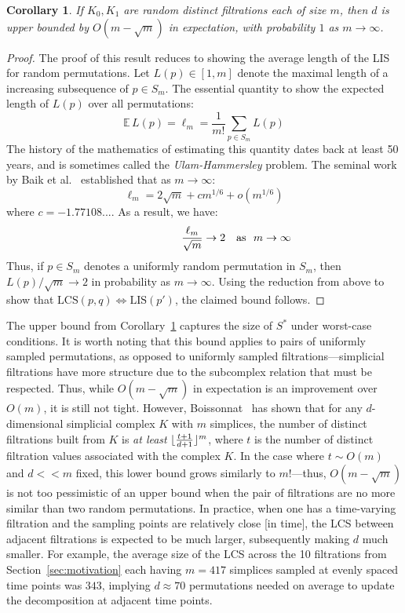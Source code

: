 \documentclass{article} %
\newtheorem{corollary}{Corollary}
\newtheorem{proof}{Proof}
\DeclarePairedDelimiter\floor{\lfloor}{\rfloor}
\begin{document}
\begin{corollary}\label{cor:expectation}
	If $K_0, K_1$ are random distinct filtrations each of size $m$, then $d$ is upper bounded by $O(m - \sqrt{m})$ in expectation, with probability $1$ as $m \to \infty$.
\end{corollary}
\begin{proof}
	The proof of this result reduces to showing the average length of the LIS for random permutations. Let $L(p) \in [1,m]$ denote the maximal length of a increasing subsequence of $p \in S_m$. 
	The essential quantity to show the expected length of $L(p)$ over all permutations: 
	$$ \mathbb{E} \, L(p) = \ell_m = \frac{1}{m!} \sum\limits_{p \in S_m} L(p)$$
	The history of the mathematics of estimating this quantity dates back at least 50 years, and is sometimes called the \emph{Ulam-Hammersley} problem. The seminal work by Baik et al.~\cite{baik1999distribution} established that as $m \to \infty$:
	$$ \displaystyle \ell_m = 2 \sqrt{m} + c m^{1/6} + o(m^{1/6}) $$
where $c = -1.77108...$. As a result, we have: 
$$ \frac{\ell_m}{\sqrt{m}} \to 2\rlap{\quad \text{as } $m \to \infty$} $$	 
Thus, if $p \in S_m$ denotes a uniformly random permutation in $S_m$, then $L(p)/\sqrt{m} \to 2$ in probability as $m \to \infty$. Using the reduction from above to show that $\mathrm{LCS}(p,q) \Leftrightarrow \mathrm{LIS}(p')$, the claimed bound follows.
\end{proof}
\noindent The upper bound from Corollary~\ref{cor:expectation} captures the size of $S^\ast$ under worst-case conditions. 
It is worth noting that this bound applies to pairs of uniformly sampled permutations, as opposed to uniformly sampled  filtrations---simplicial filtrations have more structure due to the subcomplex relation that must be respected. 
Thus, while $O(m - \sqrt{m})$ in expectation is an improvement over $O(m)$, it is still not tight. However, Boissonnat~\cite{boissonnat2018efficient} has shown that for any $d$-dimensional simplicial complex $K$ with $m$ simplices, the number of distinct filtrations built from $K$ is \emph{at least} $\floor{\frac{t+1}{d+1}}^m$, where $t$ is the number of distinct filtration values associated with the complex $K$. 
In the case where $t \sim O(m)$ and $d << m$ fixed, this lower bound grows similarly to $m!$---thus, $O(m - \sqrt{m})$ is not too pessimistic of an upper bound when the pair of filtrations are no more similar than two random permutations. 
In practice, when one has a time-varying filtration and the sampling points are relatively close [in time], the LCS between adjacent filtrations is expected to be much larger, subsequently making $d$ much smaller. 
For example, the average size of the LCS across the 10 filtrations from Section~\ref{sec:motivation} each having $m=417$ simplices sampled at evenly spaced time points was $343$, implying $d \approx 70$ permutations needed on average to update the decomposition at adjacent time points.    
 
\end{document}

